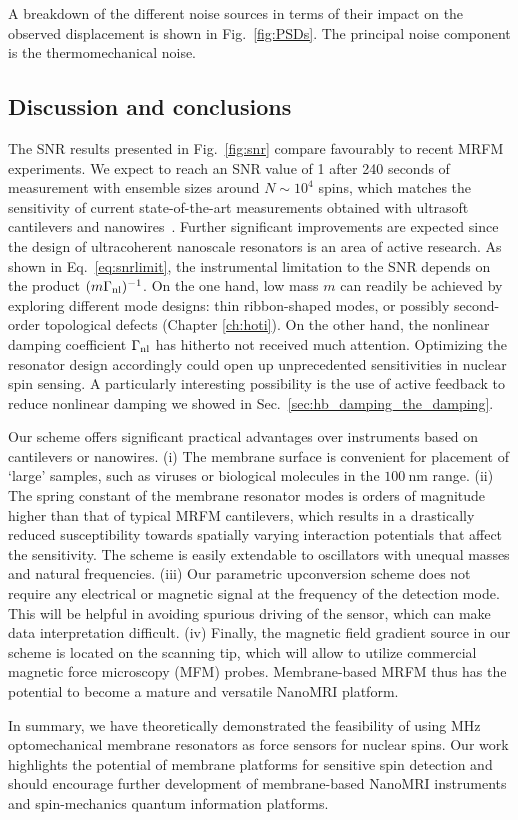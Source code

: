 A breakdown of the different noise sources in terms of their impact on the observed displacement is shown in Fig.~\ref{fig:PSDs}. The principal noise component is the thermomechanical noise.

\subsection{Discussion and conclusions} \label{subsec:spins_disc}
The SNR results presented in Fig.~\ref{fig:snr} compare favourably to recent MRFM experiments. We expect to reach an SNR value of 1 after 240 seconds of measurement with ensemble sizes around $N \sim 10^4$ spins, which matches the sensitivity of current state-of-the-art measurements obtained with ultrasoft cantilevers and nanowires~\cite{Moores_2015, Rose_2018, Grob_2019}. Further significant improvements are expected since the design of ultracoherent nanoscale resonators is an area of active research. As shown in Eq.~\eqref{eq:snrlimit}, the instrumental limitation to the SNR depends on the product $(m \Gamma_{\rm nl})^{-1}$. On the one hand, low mass $m$ can readily be achieved by exploring different mode designs: thin ribbon-shaped modes, or possibly second-order topological defects (Chapter \ref{ch:hoti}). On the other hand, the nonlinear damping coefficient $\Gamma_{\rm nl}$ has hitherto not received much attention. Optimizing the resonator design accordingly could open up unprecedented sensitivities in nuclear spin sensing. A particularly interesting possibility is the use of active feedback to reduce nonlinear damping we showed in Sec.~\ref{sec:hb_damping_the_damping}.

Our scheme offers significant practical advantages over instruments based on cantilevers or nanowires. (i) The membrane surface is convenient for placement of `large' samples, such as viruses or biological molecules in the $100~$nm range. (ii) The spring constant of the membrane resonator modes is orders of magnitude higher than that of typical MRFM cantilevers, which results in a drastically reduced susceptibility towards spatially varying interaction potentials that affect the sensitivity. The scheme is easily extendable to oscillators with unequal masses and natural frequencies. (iii) Our parametric upconversion scheme does not require any electrical or magnetic signal at the frequency of the detection mode. This will be helpful in avoiding spurious driving of the sensor, which can make data interpretation difficult. (iv) Finally, the magnetic field gradient source in our scheme is located on the scanning tip, which will allow to utilize commercial magnetic force microscopy (MFM) probes. Membrane-based MRFM thus has the potential to become a mature and versatile NanoMRI platform.

In summary, we have theoretically demonstrated the feasibility of using MHz optomechanical membrane resonators as force sensors for nuclear spins. Our work highlights the potential of membrane platforms for sensitive spin detection and should encourage further development of membrane-based NanoMRI instruments and spin-mechanics quantum information platforms.